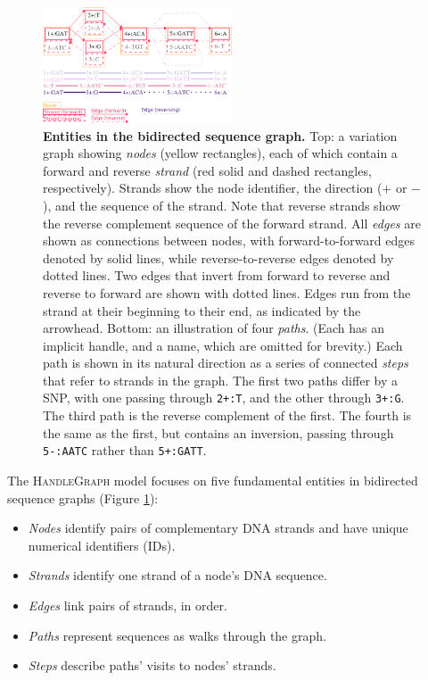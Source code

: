 \documentclass{bioinfo}
\begin{document}
\begin{methods}
\begin{figure}
	\begin{center}
		\includegraphics[width=0.5\textwidth]{figures/GRaphchrXpaper.png}
	\end{center}
	\caption{{\label{fig:graph}
        \textbf{Entities in the bidirected sequence graph.}
        Top: a variation graph showing \emph{nodes} (yellow rectangles), each of which contain a forward and reverse \emph{strand} (red solid and dashed rectangles, respectively).
        Strands show the node identifier, the direction ($+$ or $-$), and the sequence of the strand.
        Note that reverse strands show the reverse complement sequence of the forward strand.
        All \emph{edges} are shown as connections between nodes, with forward-to-forward edges denoted by solid lines, while reverse-to-reverse edges denoted by dotted lines.
        Two edges that invert from forward to reverse and reverse to forward are shown with dotted lines.
        Edges run from the strand at their beginning to their end, as indicated by the arrowhead.
        Bottom: an illustration of four \emph{paths}.
        (Each has an implicit handle, and a name, which are omitted for brevity.)
        Each path is shown in its natural direction as a series of connected \emph{steps} that refer to strands in the graph.
        The first two paths differ by a SNP, with one passing through \texttt{2+:T}, and the other through \texttt{3+:G}.
        The third path is the reverse complement of the first.
        The fourth is the same as the first, but contains an inversion, passing through \texttt{5-:AATC} rather than \texttt{5+:GATT}.
      }
    }
\end{figure}

The \textsc{HandleGraph} model focuses on five fundamental entities in bidirected sequence graphs (Figure \ref{fig:graph}):

\begin{itemize}
\item \emph{Nodes} identify pairs of complementary DNA strands and have unique numerical identifiers (IDs).
\item \emph{Strands} identify one strand of a node's DNA sequence.
\item \emph{Edges} link pairs of strands, in order.
\item \emph{Paths} represent sequences as walks through the graph.
\item \emph{Steps} describe paths' visits to nodes' strands.
\end{itemize}


\end{methods}
\end{document}
